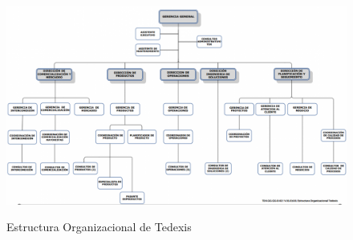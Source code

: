 \begin{figure}[ht]
  \centering
  \includegraphics[scale=0.3,type=png,ext=.png,read=.png]{imagenes/organigrama} \\
  \caption{Estructura Organizacional de Tedexis}
  \label{fig:estsyn}
\end{figure}

